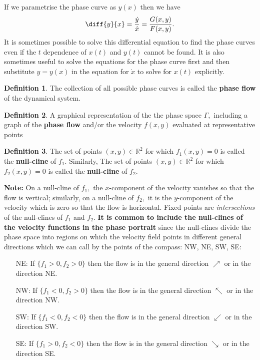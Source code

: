 \documentclass[12pt, a4paper]{article}
\newcommand{\bb}[1]{\mathbb{#1}}
\newcommand{\f}[2]{\frac{#1}{#2}}
\theoremstyle{definition}
\newtheorem{definition}{Definition}[section]
\theoremstyle{plain}
\begin{document}
If we parametrise the phase curve as $y(x)$ then we have $$\diff{y}{x}=\f{\dot{y}}{\dot{x}}=\f{G(x,y)}{F(x,y)}.$$ It is sometimes possible to solve this differential equation to find the phase curves even if the $t$ dependence of $x(t)$ and $y(t)$ cannot be found. It is also sometimes useful to solve the equations for the phase curve first and then substitute $y = y(x)$ in the equation for $\dot{x}$ to solve for $x(t)$ explicitly.

\begin{definition}
The collection of all possible phase curves is called the \textbf{phase flow} of the dynamical system.
\end{definition}

\begin{definition}
A graphical representation of the the phase space $\Gamma,$ including a graph of the \textbf{phase flow} and/or the velocity $f(x,y)$ evaluated at representative points
\end{definition}

\begin{definition}
The set of points $(x, y) \in \bb{R}^2$ for which $f_1(x, y) = 0$ is called the \textbf{null-cline} of $f_1.$ Similarly, The set of points $(x, y) \in \bb{R}^2$ for which $f_2(x, y) = 0$ is called the \textbf{null-cline} of $f_2.$
\end{definition}

\textbf{Note:} On a null-cline of $f_1,$ the $x$-component of the velocity vanishes so that the flow is vertical; similarly, on a null-cline of $f_2,$ it is the $y$-component of the velocity which is zero so that the flow is horizontal. Fixed points are \textit{intersections} of the null-clines of $f_1$ and $f_2.$ \textbf{It is common to include the null-clines of the velocity functions in the phase portrait} since the null-clines divide the phase space into regions on which the velocity field points in different general directions which we can call by the points of the compass: NW, NE, SW, SE: 
\begin{itemize}

	\item [NE:] If $\{f_1 > 0, f_2 > 0\}$ then the flow is in the general direction $\nearrow$ or in the direction NE.

	\item[NW:] If $\{f_1 < 0, f_2 > 0\}$ then the flow is in the general direction $\nwarrow$ or in the direction NW.

	\item[SW:] If $\{f_1 < 0, f_2 < 0\}$ then the flow is in the general direction $\swarrow$ or in the direction SW.

	\item[SE:] If $\{f_1 > 0, f_2 < 0\}$ then the flow is in the general direction $\searrow$ or in the direction SE.

\end{itemize}
\end{document}
